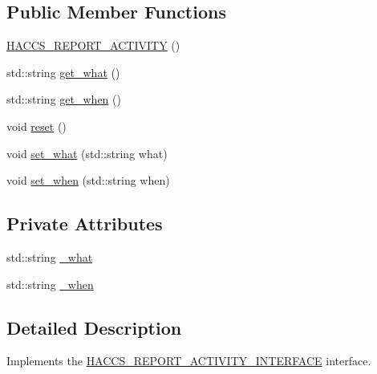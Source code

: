 \subsection*{Public Member Functions}
\begin{DoxyCompactItemize}
\item 
\hyperlink{classAsteroids_1_1Domain_1_1Server_1_1HACCS__REPORT__ACTIVITY_a843939501e175620371d01d53e708537}{H\+A\+C\+C\+S\+\_\+\+R\+E\+P\+O\+R\+T\+\_\+\+A\+C\+T\+I\+V\+I\+TY} ()
\item 
std\+::string \hyperlink{classAsteroids_1_1Domain_1_1Server_1_1HACCS__REPORT__ACTIVITY_a8f6d5b877337feefefaa85bf639166e9}{get\+\_\+what} ()
\item 
std\+::string \hyperlink{classAsteroids_1_1Domain_1_1Server_1_1HACCS__REPORT__ACTIVITY_aadf4a3c95f8340e4fa01a8d0aedecc27}{get\+\_\+when} ()
\item 
void \hyperlink{classAsteroids_1_1Domain_1_1Server_1_1HACCS__REPORT__ACTIVITY_a2c3003f6cf17387190009a152644b80f}{reset} ()
\item 
void \hyperlink{classAsteroids_1_1Domain_1_1Server_1_1HACCS__REPORT__ACTIVITY_ac288905c22c264101f873e4aa46b05f8}{set\+\_\+what} (std\+::string what)
\item 
void \hyperlink{classAsteroids_1_1Domain_1_1Server_1_1HACCS__REPORT__ACTIVITY_ae4f559ef148e51112899477c853dc806}{set\+\_\+when} (std\+::string when)
\end{DoxyCompactItemize}
\subsection*{Private Attributes}
\begin{DoxyCompactItemize}
\item 
std\+::string \hyperlink{classAsteroids_1_1Domain_1_1Server_1_1HACCS__REPORT__ACTIVITY_a4c8c60b15935d16ea73c09847d14c696}{\+\_\+what}
\item 
std\+::string \hyperlink{classAsteroids_1_1Domain_1_1Server_1_1HACCS__REPORT__ACTIVITY_a3e068d5e591c98d835add7f62137f370}{\+\_\+when}
\end{DoxyCompactItemize}


\subsection{Detailed Description}
Implements the \hyperlink{classAsteroids_1_1Domain_1_1Server_1_1HACCS__REPORT__ACTIVITY__INTERFACE}{H\+A\+C\+C\+S\+\_\+\+R\+E\+P\+O\+R\+T\+\_\+\+A\+C\+T\+I\+V\+I\+T\+Y\+\_\+\+I\+N\+T\+E\+R\+F\+A\+CE} interface. 

